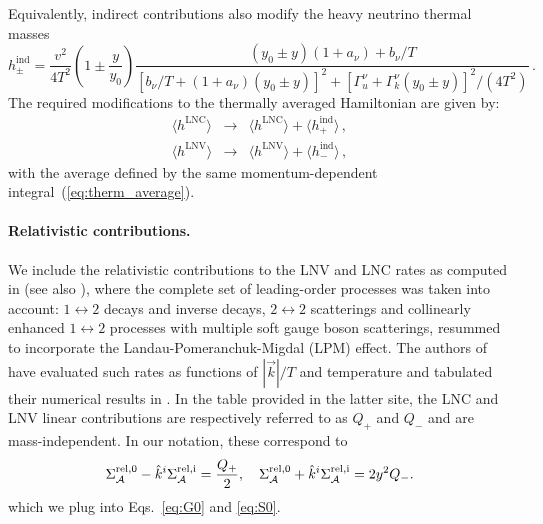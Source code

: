 \documentclass[12pt, a4paper]{article}
\newcommand\AG[1]{{\color{orange} [{AG: \bf #1}]}}
\begin{document}
Equivalently, indirect contributions also modify the heavy neutrino thermal masses
 \begin{equation}
  h^\mathrm{ind}_\pm = \frac{v^2}{4T^2}\left(1\pm\frac{y}{y_0}\right) 
  \frac{(y_0 \pm y) (1+a_\nu) + b_\nu/T}{[b_\nu/T+(1+a_\nu) (y_0 \pm y)]^2 + [\Gamma_u^\nu + \Gamma_k^\nu (y_0 \pm y)]^2/(4T^2)}\,.
 \end{equation}
The required modifications to the thermally averaged Hamiltonian are given by:
\begin{eqnarray}
  \langle h^\mathrm{LNC} \rangle & \rightarrow& \langle h^\mathrm{LNC} \rangle + \langle h^\mathrm{ind}_+ \rangle \,,\\
  \langle h^\mathrm{LNV} \rangle & \rightarrow& \langle h^\mathrm{LNV} \rangle + \langle h^\mathrm{ind}_- \rangle\,,
\end{eqnarray}
with the average defined by the same momentum-dependent integral~(\ref{eq:therm_average}).

\paragraph{Relativistic contributions.} We include the relativistic contributions to the LNV and LNC rates as computed in \cite{Ghiglieri:2017gjz, Ghiglieri:2017csp} (see also \cite{Ghiglieri:2018wbs}), where the complete set of leading-order processes was taken into account: $1 \leftrightarrow 2$ decays and inverse decays, $2 \leftrightarrow 2$ scatterings and collinearly enhanced $1 \leftrightarrow 2$ processes with multiple soft gauge boson scatterings, resummed to incorporate the Landau-Pomeranchuk-Migdal (LPM) effect. The authors of \cite{Ghiglieri:2017gjz, Ghiglieri:2017csp, Ghiglieri:2018wbs} have evaluated such rates as functions of $|\vec{k}|/T$ and temperature and tabulated their numerical results in \href{http://www.laine.itp.unibe.ch/leptogenesis/}{}. In the table provided in the latter site, the LNC and LNV linear contributions are respectively referred to as $Q_+$ and $Q_-$ and are mass-independent. In our notation, these correspond to
\begin{equation}
 \Sigma_{\mathcal{A}}^{\rm rel, 0} - \hat{k}^i\Sigma_{\mathcal{A}}^{\rm rel, i} = \frac{Q_+}{2},\quad \Sigma_{\mathcal{A}}^{\rm rel, 0} + \hat{k}^i\Sigma_{\mathcal{A}}^{\rm rel, i} = 2y^2 Q_-.
\end{equation}
which we plug into Eqs.~\eqref{eq:G0} and \eqref{eq:S0}.
\end{document}
